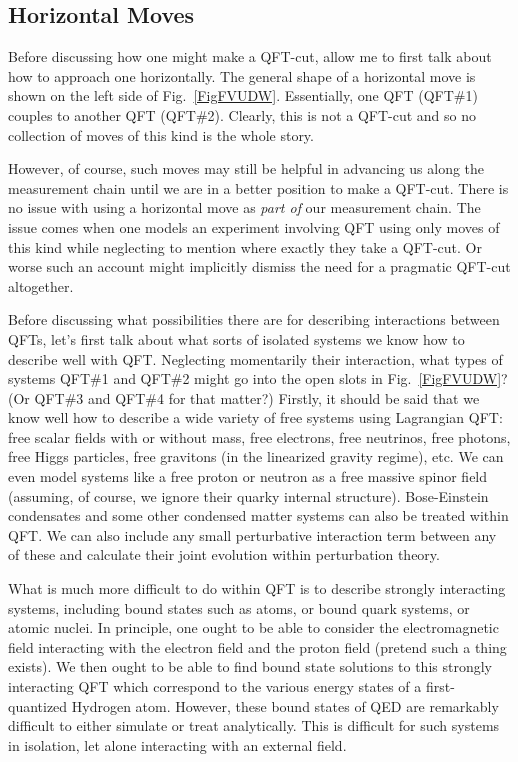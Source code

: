 \documentclass[12pt,prd,superscriptaddress,floatfix,amsmath,amssymb,amsfonts,nofootinbib]{revtex4-2}
\begin{document}
\subsection{Horizontal Moves}
Before discussing how one might make a QFT-cut, allow me to first talk about how to approach one horizontally. The general shape of a horizontal move is shown on the left side of Fig.~\ref{FigFVUDW}. Essentially, one QFT (QFT\#1) couples to another QFT (QFT\#2). Clearly, this is not a QFT-cut and so no collection of moves of this kind is the whole story.

However, of course, such moves may still be helpful in advancing us along the measurement chain until we are in a better position to make a QFT-cut. There is no issue with using a horizontal move as \textit{part of} our measurement chain. The issue comes when one models an experiment involving QFT using only moves of this kind while neglecting to mention where exactly they take a QFT-cut. Or worse such an account might implicitly dismiss the need for a pragmatic QFT-cut altogether. %

Before discussing what possibilities there are for describing interactions between QFTs, let's first talk about what sorts of isolated systems we know how to describe well with QFT. Neglecting momentarily their interaction, what types of systems QFT\#1 and QFT\#2 might go into the open slots in Fig.~\ref{FigFVUDW}? (Or QFT\#3 and QFT\#4 for that matter?) Firstly, it should be said that we know well how to describe a wide variety of free systems using Lagrangian QFT: free scalar fields with or without mass, free electrons, free neutrinos, free photons, free Higgs particles, free gravitons (in the linearized gravity regime), etc. We can even model systems like a free proton or neutron as a free massive spinor field (assuming, of course, we ignore their quarky internal structure). Bose-Einstein condensates and some other condensed matter systems can also be treated within QFT. We can also include any small perturbative interaction term between any of these and calculate their joint evolution within perturbation theory.

What is much more difficult to do within QFT is to describe strongly interacting systems, including bound states such as atoms, or bound quark systems, or atomic nuclei. In principle, one ought to be able to consider the electromagnetic field interacting with the electron field and the proton field (pretend such a thing exists). We then ought to be able to find bound state solutions to this strongly interacting QFT which correspond to the various energy states of a first-quantized Hydrogen atom. However, these bound states of QED are remarkably difficult to either simulate or treat analytically. This is difficult for such systems in isolation, let alone interacting with an external field.
\end{document}
